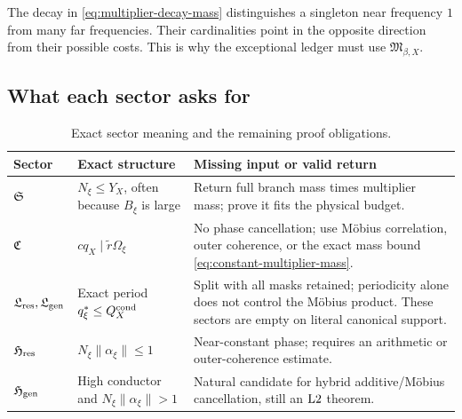 \begin{remark}
The decay in \eqref{eq:multiplier-decay-mass} distinguishes a
singleton near frequency \(1\) from many far frequencies.  Their
cardinalities point in the opposite direction from their possible
costs.  This is why the exceptional ledger must use
\(\mathfrak M_{\beta,X}\).
\end{remark}

\subsection{What each sector asks for}

\begin{table}[H]
\centering
\small
\begin{tabularx}{\textwidth}{@{}
 >{\raggedright\arraybackslash}p{}
 >{\raggedright\arraybackslash}p{}
 >{\raggedright\arraybackslash}X@{}}
\toprule
Sector & Exact structure & Missing input or valid return\\
\midrule
\(\mathfrak S\)
&
\(N_\xi\le Y_X\), often because \(B_\xi\) is large
&
Return full branch mass times multiplier mass; prove it fits the
physical budget.
\\
\addlinespace
\(\mathfrak C\)
&
\(cq_X\mid\widetilde r\Omega_\xi\)
&
No phase cancellation; use M\"obius correlation, outer coherence, or
the exact mass bound \eqref{eq:constant-multiplier-mass}.
\\
\addlinespace
\(\mathfrak L_{\rm res},\mathfrak L_{\rm gen}\)
&
Exact period \(q_\xi^\ast\le Q_X^{\rm cond}\)
&
Split with all masks retained; periodicity alone does not control the
M\"obius product.  These sectors are empty on literal canonical
support.
\\
\addlinespace
\(\mathfrak H_{\rm res}\)
&
\(N_\xi\|\alpha_\xi\|\le1\)
&
Near-constant phase; requires an arithmetic or outer-coherence
estimate.
\\
\addlinespace
\(\mathfrak H_{\rm gen}\)
&
High conductor and \(N_\xi\|\alpha_\xi\|>1\)
&
Natural candidate for hybrid additive/M\"obius cancellation, still
an \(\mathrm{L2}\) theorem.
\\
\bottomrule
\end{tabularx}
\caption{Exact sector meaning and the remaining proof obligations.}
\label{tab:sector-obligations}
\end{table}

